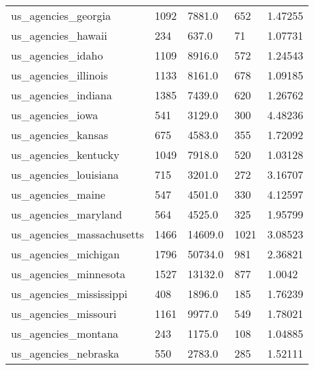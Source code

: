 \begin{longtable}{lllll}
 us\_agencies\_georgia                                & 1092       & 7881.0      & 652   & 1.47255    \\
 us\_agencies\_hawaii                                 & 234        & 637.0       & 71    & 1.07731    \\
 us\_agencies\_idaho                                  & 1109       & 8916.0      & 572   & 1.24543    \\
 us\_agencies\_illinois                               & 1133       & 8161.0      & 678   & 1.09185    \\
 us\_agencies\_indiana                                & 1385       & 7439.0      & 620   & 1.26762    \\
 us\_agencies\_iowa                                   & 541        & 3129.0      & 300   & 4.48236    \\
 us\_agencies\_kansas                                 & 675        & 4583.0      & 355   & 1.72092    \\
 us\_agencies\_kentucky                               & 1049       & 7918.0      & 520   & 1.03128    \\
 us\_agencies\_louisiana                              & 715        & 3201.0      & 272   & 3.16707    \\
 us\_agencies\_maine                                  & 547        & 4501.0      & 330   & 4.12597    \\
 us\_agencies\_maryland                               & 564        & 4525.0      & 325   & 1.95799    \\
 us\_agencies\_massachusetts                          & 1466       & 14609.0     & 1021  & 3.08523    \\
 us\_agencies\_michigan                               & 1796       & 50734.0     & 981   & 2.36821    \\
 us\_agencies\_minnesota                              & 1527       & 13132.0     & 877   & 1.0042     \\
 us\_agencies\_mississippi                            & 408        & 1896.0      & 185   & 1.76239    \\
 us\_agencies\_missouri                               & 1161       & 9977.0      & 549   & 1.78021    \\
 us\_agencies\_montana                                & 243        & 1175.0      & 108   & 1.04885    \\
 us\_agencies\_nebraska                               & 550        & 2783.0      & 285   & 1.52111    \\

\end{longtable}
